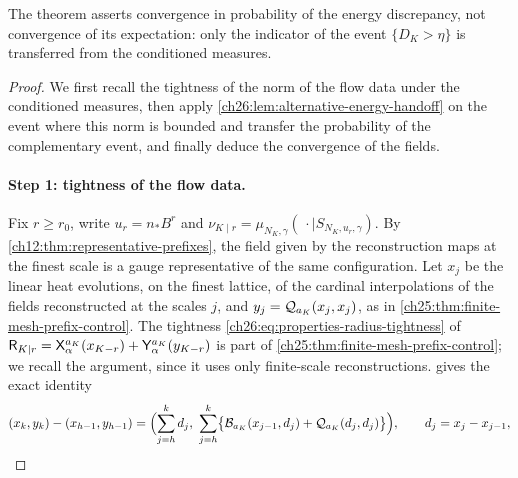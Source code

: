 The theorem asserts convergence in probability of the energy discrepancy, not convergence of its expectation: only the indicator of the event $\{D_K>\eta\}$ is transferred from the conditioned measures.

\begin{proof}
We first recall the tightness of the norm of the flow data under the conditioned measures, then apply \cref{ch26:lem:alternative-energy-handoff} on the event where this norm is bounded and transfer the probability of the complementary event, and finally deduce the convergence of the fields.

\paragraph{Step 1: tightness of the flow data.}
Fix $r\ge r_0$, write $u_r=n_*B^r$ and $\nu_{K\mid r}=\mu_{N_K,\gamma}(\,\cdot\mid S_{N_K,u_r,\gamma})$. By \cref{ch12:thm:representative-prefixes}, the field given by the reconstruction maps at the finest scale is a gauge representative of the same configuration. Let $x_j$ be the linear heat evolutions, on the finest lattice, of the cardinal interpolations of the fields reconstructed at the scales $j$, and $y_j=\mathcal Q_{a_K}(x_j,x_j)$, as in \cref{ch25:thm:finite-mesh-prefix-control}. The tightness \eqref{ch26:eq:properties-radius-tightness} of $\mathsf R_{K\mid r}=\mathsf X_{\alpha}^{a_K}(x_{K-r})+\mathsf Y_{\alpha}^{a_K}(y_{K-r})$ is part of \cref{ch25:thm:finite-mesh-prefix-control}; we recall the argument, since it uses only finite-scale reconstructions.  gives the exact identity
\[
 (x_k,y_k)-(x_{h-1},y_{h-1})=\Bigl(\sum_{j=h}^kd_j,\ \sum_{j=h}^k\bigl\{\Polarized{a_K}(x_{j-1},d_j)+\Duhamel{a_K}(d_j,d_j)\bigr\}\Bigr),\qquad d_j=x_j-x_{j-1},
\]

\end{proof}
